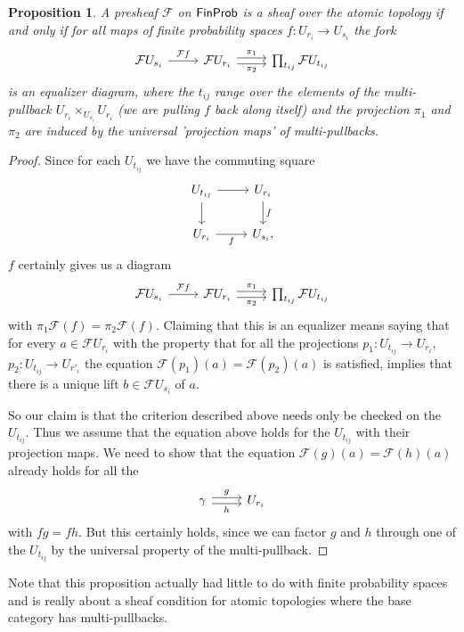 \documentclass[a4paper]{amsproc}
\theoremstyle{plain}
\newtheorem{proposition}[theorem]{Proposition}
\theoremstyle{definition}
\theoremstyle{remark}
\numberwithin{equation}{section}
\newcommand{\FinProb}{\textup{\textsf{FinProb}}}
\begin{document}
\begin{proposition} \label{sheaf_condition}
A presheaf $\mathcal{F}$ on $\FinProb$ is a sheaf over the atomic topology if and only if for all maps of finite probability spaces $f: U_{r_i} \to U_{s_i}$ the fork
\[
\begin{tikzcd}
\mathcal{F} U_{s_i} \arrow[r, "\mathcal{F}f"] &
\mathcal{F} U_{r_i} \arrow[r, "\pi_1", shift left] \arrow[r, "\pi_2"', shift right] & \prod_{t_{ij}} \mathcal{F} U_{t_{ij}}
\end{tikzcd}
\]
is an equalizer diagram, where the $t_{ij}$ range over the elements of the multi-pullback $U_{r_i} \times_{U_{s_i}} U_{r_i}$ (we are pulling $f$ back along itself) and the projection $\pi_1$ and $\pi_2$ are induced by the universal 'projection maps' of multi-pullbacks.
\end{proposition}
\begin{proof}
Since for each $U_{t_{ij}}$ we have the commuting square
\[
\begin{tikzcd}
U_{t_{ij}} \arrow[r] \arrow[d] & {U_{r_i}} \arrow[d, "f"] \\
{U_{r_i}} \arrow[r, "f"']            & {U_{s_i}} ,
\end{tikzcd}
\]
$f$ certainly gives us a diagram
\[
\begin{tikzcd}
\mathcal{F} U_{s_i} \arrow[r, "\mathcal{F}f"] & \mathcal{F} U_{r_i} \arrow[r, "\pi_1", shift left] \arrow[r, "\pi_2"', shift right] & \prod_{t_{ij}} \mathcal{F} U_{t_{ij}}
\end{tikzcd}
\]
with $\pi_1 \mathcal{F}(f) = \pi_2 \mathcal{F}(f)$. Claiming that this is an equalizer means saying that for every $a \in \mathcal{F}U_{r_i}$ with the property that for all the projections $p_1: U_{t_{ij}} \to U_{r_i}$, $p_2: U_{t_{ij}} \to U_{r'_i}$ the equation $\mathcal{F}(p_1)(a) = \mathcal{F}(p_2)(a)$ is satisfied, implies that there is a unique lift $b \in \mathcal{F}U_{s_i}$ of $a$.

So our claim is that the criterion described above needs only be checked on the $U_{t_{ij}}$. Thus we assume that the equation above holds for the $U_{t_{ij}}$ with their projection maps. We need to show that the equation $\mathcal{F}(g)(a) = \mathcal{F}(h)(a)$ already holds for all the \[
\begin{tikzcd}
\gamma \arrow[r, "g", shift left] \arrow[r, "h"', shift right] & U_{r_i}
\end{tikzcd}
\]
with $fg = fh$. But this certainly holds, since we can factor $g$ and $h$ through one of the $U_{t_{ij}}$ by the universal property of the multi-pullback.
\end{proof}

Note that this proposition actually had little to do with finite probability spaces and is really about a sheaf condition for atomic topologies where the base category has multi-pullbacks.




\end{document}
